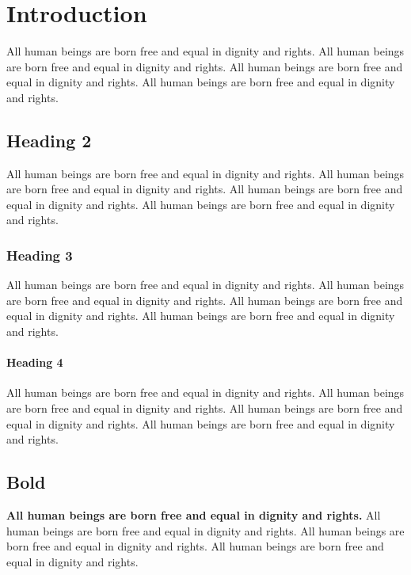 \documentclass[
  titlepage,
  openright,
  DIV=calc,
  toc=listof,
  listof=nochaptergap]{scrbook}
\begin{document}
\chapter{Introduction}\label{sec:introduction}

All human beings are born free and equal in dignity and rights. All
human beings are born free and equal in dignity and rights. All human
beings are born free and equal in dignity and rights. All human beings
are born free and equal in dignity and rights.

\section{Heading 2}\label{heading-2}

All human beings are born free and equal in dignity and rights. All
human beings are born free and equal in dignity and rights. All human
beings are born free and equal in dignity and rights. All human beings
are born free and equal in dignity and rights.

\subsection{Heading 3}\label{heading-3}

All human beings are born free and equal in dignity and rights. All
human beings are born free and equal in dignity and rights. All human
beings are born free and equal in dignity and rights. All human beings
are born free and equal in dignity and rights.

\subsubsection{Heading 4}\label{heading-4}

All human beings are born free and equal in dignity and rights. All
human beings are born free and equal in dignity and rights. All human
beings are born free and equal in dignity and rights. All human beings
are born free and equal in dignity and rights.

\section{Bold}\label{bold}

\textbf{All human beings are born free and equal in dignity and rights.}
All human beings are born free and equal in dignity and rights. All
human beings are born free and equal in dignity and rights. All human
beings are born free and equal in dignity and rights.
\end{document}
